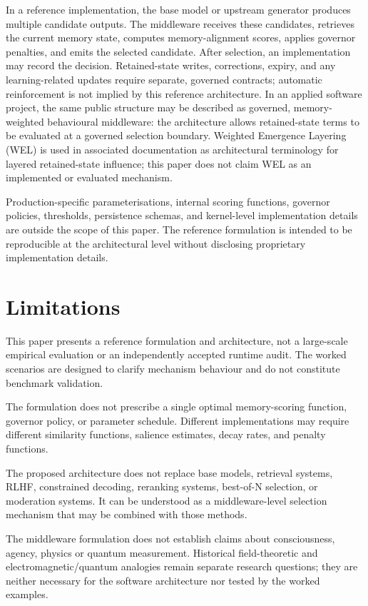 \documentclass[11pt]{article}
\begin{document}
In a reference implementation, the base model or upstream generator produces multiple candidate outputs. The middleware receives these candidates, retrieves the current memory state, computes memory-alignment scores, applies governor penalties, and emits the selected candidate. After selection, an implementation may record the decision. Retained-state writes, corrections, expiry, and any learning-related updates require separate, governed contracts; automatic reinforcement is not implied by this reference architecture. In an applied software project, the same public structure may be described as governed, memory-weighted behavioural middleware: the architecture allows retained-state terms to be evaluated at a governed selection boundary. Weighted Emergence Layering (WEL) is used in associated documentation as architectural terminology for layered retained-state influence; this paper does not claim WEL as an implemented or evaluated mechanism.

Production-specific parameterisations, internal scoring functions, governor policies, thresholds, persistence schemas, and kernel-level implementation details are outside the scope of this paper. The reference formulation is intended to be reproducible at the architectural level without disclosing proprietary implementation details.

\section{Limitations}

This paper presents a reference formulation and architecture, not a large-scale empirical evaluation or an independently accepted runtime audit. The worked scenarios are designed to clarify mechanism behaviour and do not constitute benchmark validation.

The formulation does not prescribe a single optimal memory-scoring function, governor policy, or parameter schedule. Different implementations may require different similarity functions, salience estimates, decay rates, and penalty functions.

The proposed architecture does not replace base models, retrieval systems, RLHF, constrained decoding, reranking systems, best-of-N selection, or moderation systems. It can be understood as a middleware-level selection mechanism that may be combined with those methods.

The middleware formulation does not establish claims about consciousness, agency, physics or quantum measurement. Historical field-theoretic and electromagnetic/quantum analogies remain separate research questions; they are neither necessary for the software architecture nor tested by the worked examples.
\end{document}
